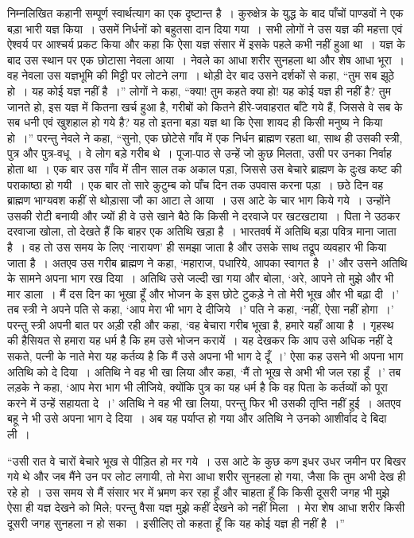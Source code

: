 निम्नलिखित कहानी सम्पूर्ण स्वार्थत्याग का एक दृष्टान्त है~। कुरुक्षेत्र के युद्ध के बाद पाँचों पाण्डवों ने एक बड़ा भारी यज्ञ किया~। उसमें निर्धनों को बहुतसा दान दिया गया~। सभी लोगों ने उस यज्ञ की महत्ता एवं ऐश्वर्य पर आश्चर्य प्रकट किया और कहा कि ऐसा यज्ञ संसार में इसके पहले कभी नहीं हुआ था~। यज्ञ के बाद उस स्थान पर एक छोटासा नेवला आया~। नेवले का आधा शरीर सुनहला था और शेष आधा भूरा~। वह नेवला उस यज्ञभूमि की मिट्टी पर लोटने लगा~। थोड़ी देर बाद उसने दर्शकों से कहा, “तुम सब झूठे हो~। यह कोई यज्ञ नहीं है~।” लोगों ने कहा, “क्या! तुम कहते क्या हो! यह कोई यज्ञ ही नहीं है? तुम जानते हो, इस यज्ञ में कितना खर्च हुआ है, गरीबों को कितने हीरे-जवाहरात बाँटे गये हैं, जिससे वे सब के सब धनी एवं खुशहाल हो गये है? यह तो इतना बड़ा यज्ञ था कि ऐसा शायद ही किसी मनुष्य ने किया हो~।” परन्तु नेवले ने कहा, “सुनो, एक छोटेसे गाँव में एक निर्धन ब्राह्मण रहता था, साथ ही उसकी स्त्री, पुत्र और पुत्र-वधू~। वे लोग बड़े गरीब थे~। पूजा-पाठ से उन्हें जो कुछ मिलता, उसी पर उनका निर्वाह होता था~। एक बार उस गाँव में तीन साल तक अकाल पड़ा, जिससे उस बेचारे ब्राह्मण के दुःख कष्ट की पराकाष्ठा हो गयी~। एक बार तो सारे कुटुम्ब को पाँच दिन तक उपवास करना पड़ा~। छठे दिन वह ब्राह्मण भाग्यवश कहीं से थोड़ासा जौ का आटा ले आया~। उस आटे के चार भाग किये गये~। उन्होंने उसकी रोटी बनायी और ज्यों ही वे उसे खाने बैठे कि किसी ने दरवाजे पर खटखटाया~। पिता ने उठकर दरवाजा खोला, तो देखते हैं कि बाहर एक अतिथि खड़ा है~। भारतवर्ष में अतिथि बड़ा पवित्र माना जाता है~। वह तो उस समय के लिए ‘नारायण’ ही समझा जाता है और उसके साथ तद्रूप व्यवहार भी किया जाता है~। अतएव उस गरीब ब्राह्मण ने कहा, ‘महाराज, पधारिये, आपका स्वागत है~।’ और उसने अतिथि के सामने अपना भाग रख दिया~। अतिथि उसे जल्दी खा गया और बोला, ‘अरे, आपने तो मुझे और भी मार डाला~। मैं दस दिन का भूखा हूँ और भोजन के इस छोटे टुकड़े ने तो मेरी भूख और भी बढ़ा दी~।’ तब स्त्री ने अपने पति से कहा, ‘आप मेरा भी भाग दे दीजिये~।’ पति ने कहा, ‘नहीं, ऐसा नहीं होगा~।’ परन्तु स्त्री अपनी बात पर अड़ी रही और कहा, ‘वह बेचारा गरीब भूखा है, हमारे यहाँ आया है~। गृहस्थ की हैसियत से हमारा यह धर्म है कि हम उसे भोजन करायें~। यह देखकर कि आप उसे अधिक नहीं दे सकते, पत्नी के नाते मेरा यह कर्तव्य है कि मैं उसे अपना भी भाग दे दूँ~।’ ऐसा कह उसने भी अपना भाग अतिथि को दे दिया~। अतिथि ने वह भी खा लिया और कहा, ‘मैं तो भूख से अभी भी जल रहा हूँ~।’ तब लड़के ने कहा, ‘आप मेरा भाग भी लीजिये, क्योंकि पुत्र का यह धर्म है कि वह पिता के कर्तव्यों को पूरा करने में उन्हें सहायता दे~।’ अतिथि ने वह भी खा लिया, परन्तु फिर भी उसकी तृप्ति नहीं हुई~। अतएव बहू ने भी उसे अपना भाग दे दिया~। अब यह पर्याप्त हो गया और अतिथि ने उनको आशीर्वाद दे बिदा ली~।

“उसी रात वे चारों बेचारे भूख से पीड़ित हो मर गये~। उस आटे के कुछ कण इधर उधर जमीन पर बिखर गये थे और जब मैंने उन पर लोट लगायी, तो मेरा आधा शरीर सुनहला हो गया, जैसा कि तुम अभी देख ही रहे हो~। उस समय से मैं संसार भर में भ्रमण कर रहा हूँ और चाहता हूँ कि किसी दूसरी जगह भी मुझे ऐसा ही यज्ञ देखने को मिले; परन्तु वैसा यज्ञ मुझे कहीं देखने को नहीं मिला~। मेरा शेष आधा शरीर किसी दूसरी जगह सुनहला न हो सका~। इसीलिए तो कहता हूँ कि यह कोई यज्ञ ही नहीं है~।”


